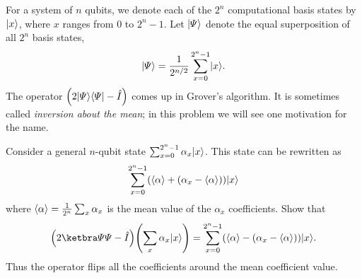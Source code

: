 \documentclass{../phys084}
\begin{document}
\begin{exercise}
  For a system of \(n\) qubits, we denote each of the \(2^n\)
  computational basis states by \(\ket x\), where \(x\) ranges from
  \(0\) to \(2^n-1\).  Let \(\ket \Psi\) denote the equal
  superposition of all \(2^n\) basis states,
  \[
    \ket \Psi = \frac{1}{2^{n/2}} \sum^{2^n-1}_{x=0} \ket x.
  \]
  The operator \(\prn*{2 \ket \Psi \bra \Psi - \hat I}\) comes up in
  Grover's algorithm.  It is sometimes called \textit{inversion about
    the mean}; in this problem we will see one motivation for the
  name.

  Consider a general \(n\)-qubit state
  \(\sum^{2^n-1}_{x=0} \alpha_x \ket x\).  This state can be rewritten
  as
  \[
    \sum_{x=0}^{2^n-1}
    (\abr \alpha + (\alpha_x - \abr \alpha)) \ket x
  \]
  where \(\abr \alpha = \frac{1}{2^n} \sum_x \alpha_x\) is the mean
  value of the \(\alpha_x\) coefficients.  Show that
  \[
    \prn*{2 \ketbra \Psi \Psi - \hat I}
    \prn*{\sum_x \alpha_x \ket x}
    = \sum_{x=0}^{2^n-1}
    (\abr \alpha - (\alpha_x - \abr \alpha)) \ket x.
  \]
  Thus the operator flips all the coefficients around the mean
  coefficient value.
\end{exercise}

\begin{solution}

\end{solution}
\end{document}
